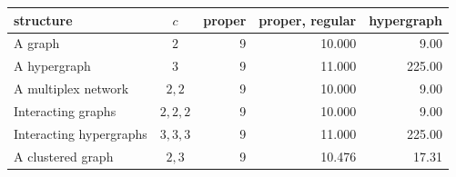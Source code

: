 \begin{tabular}{lcrrr}
\hline\hline
structure & $c$ & proper & proper, regular & hypergraph\\
\hline
A graph & $2$ & 9 & 10.000 & 9.00\\
A hypergraph & $3$ & 9 & 11.000 & 225.00\\
A multiplex network & $2,2$ & 9 & 10.000 & 9.00\\
Interacting graphs & $2,2,2$ & 9 & 10.000 & 9.00\\
Interacting hypergraphs & $3,3,3$ & 9 & 11.000 & 225.00\\
A clustered graph & $2,3$ & 9 & 10.476 & 17.31\\
\hline\hline
\end{tabular}
